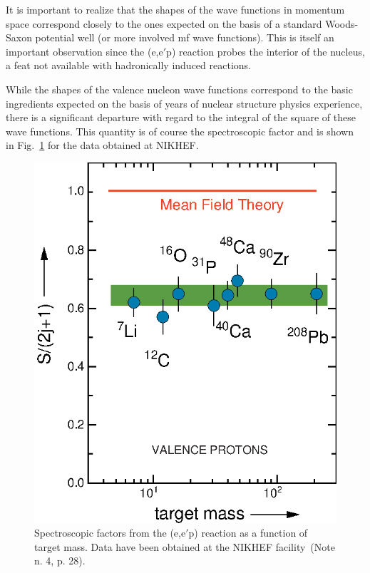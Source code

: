 It is important to realize that the shapes of the wave functions
in momentum space correspond closely to the ones expected on
the basis of a standard Woods-Saxon potential well (or more involved
mf wave functions).
This is itself an important observation since the (e,e$'$p) reaction
probes the interior of the nucleus, a feat not available with hadronically
induced reactions.

While the shapes of the valence nucleon wave functions correspond to the basic
ingredients expected on the basis of years of nuclear structure physics
experience, there is a significant departure with regard to the integral
of the square of these wave functions.
This quantity is of course the spectroscopic factor
and is shown in Fig.~\ref{fig:louk2} for the data obtained at 
NIKHEF.
\begin{figure}[!pbt]
\vspace*{.5cm}       
 \begin{center}
    \includegraphics[height=0.30\textheight]{saval2c.eps}
\end{center}
\caption{Spectroscopic factors from the (e,e$'$p) reaction as a function
of target mass. Data have been obtained at the NIKHEF facility~(Note n. 4, p. 28).
\label{fig:louk2} }
\end{figure}
